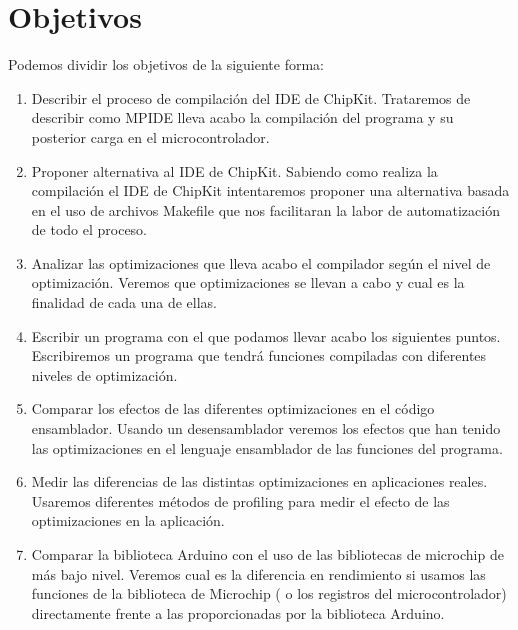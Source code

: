 \section{Objetivos}
Podemos dividir los objetivos de la siguiente forma:
\begin{enumerate}
    \item Describir el proceso de compilación del IDE de ChipKit. Trataremos de describir como MPIDE lleva acabo la compilación del programa y su posterior carga en el microcontrolador.
    \item Proponer alternativa al IDE de ChipKit. Sabiendo como realiza la compilación el IDE de ChipKit intentaremos proponer una alternativa basada en el uso de archivos Makefile que nos facilitaran la labor de automatización de todo el proceso.
    \item Analizar las optimizaciones que lleva acabo el compilador según el nivel de optimización. Veremos que optimizaciones se llevan a cabo y cual es la finalidad de cada una de ellas.
    \item Escribir un programa con el que podamos llevar acabo los siguientes puntos. Escribiremos un programa que tendrá funciones compiladas con diferentes niveles de optimización.
    \item Comparar los efectos de las diferentes optimizaciones en el código ensamblador. Usando un desensamblador veremos los efectos que han tenido las optimizaciones en el lenguaje ensamblador de las funciones del programa.
    \item Medir las diferencias de las distintas optimizaciones en aplicaciones reales. Usaremos diferentes métodos de profiling para medir el efecto de las optimizaciones en la aplicación.
    \item Comparar la biblioteca Arduino con el uso de las bibliotecas de microchip de más bajo nivel.   Veremos cual es la diferencia en rendimiento si usamos las funciones de la biblioteca de Microchip ( o los registros del microcontrolador) directamente frente a las proporcionadas por la biblioteca Arduino.
\end{enumerate}